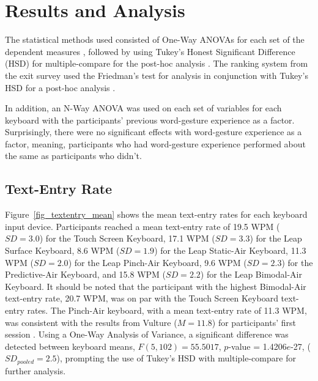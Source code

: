 \chapter{Results and Analysis} \label{5_results}
The statistical methods used consisted of One-Way ANOVAs for each set of the dependent measures \cite{ref_anova_1,ref_anova_2}, followed by using Tukey's Honest Significant Difference (HSD) for multiple-compare for the post-hoc analysis \cite{ref_mult_compare}. The ranking system from the exit survey used the Friedman's test for analysis in conjunction with Tukey's HSD for a post-hoc analysis \cite{ref_friedmans}.

In addition, an N-Way ANOVA was used on each set of variables for each keyboard with the participants' previous word-gesture experience as a factor. Surprisingly, there were no significant effects with word-gesture experience as a factor, meaning, participants who had word-gesture experience performed about the same as participants who didn't.

\section{Text-Entry Rate}
Figure~\ref{fig_textentry_mean} shows the mean text-entry rates for each keyboard input device. Participants reached a mean text-entry rate of 19.5 WPM ($SD = 3.0$) for the Touch Screen Keyboard, 17.1 WPM ($SD = 3.3$) for the Leap Surface Keyboard, 8.6 WPM ($SD = 1.9$) for the Leap Static-Air Keyboard, 11.3 WPM ($SD = 2.0$) for the Leap Pinch-Air Keyboard, 9.6 WPM ($SD = 2.3$) for the Predictive-Air Keyboard, and 15.8 WPM ($SD = 2.2$) for the Leap Bimodal-Air Keyboard. It should be noted that the participant with the highest Bimodal-Air text-entry rate, 20.7 WPM, was on par with the Touch Screen Keyboard text-entry rates. The Pinch-Air keyboard, with a mean text-entry rate of 11.3 WPM, was consistent with the results from Vulture ($M = 11.8$) for participants' first session \cite{ref_vulture}. Using a One-Way Analysis of Variance, a significant difference was detected between keyboard means, $F(5, 102) = 55.5017$, $p$-value = 1.4206$e$-27, ($SD_{pooled} = 2.5$), prompting the use of Tukey's HSD with multiple-compare for further analysis.

